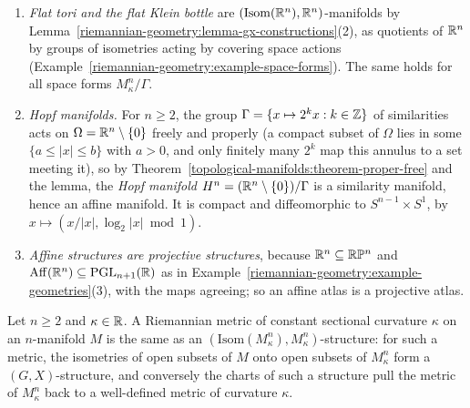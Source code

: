 \begin{example}\label{riemannian-geometry:example-gx-structures}
\begin{enumerate}
\item \emph{Flat tori and the flat Klein bottle} are $(\mathrm{Isom}(\mathbb{R}^n), \mathbb{R}^n)$-manifolds by Lemma~\ref{riemannian-geometry:lemma-gx-constructions}(2), as quotients of $\mathbb{R}^n$ by groups of isometries acting by covering space actions
(Example~\ref{riemannian-geometry:example-space-forms}). The same holds for all space forms $M^n_\kappa/\Gamma$.
\item \emph{Hopf manifolds.} For $n \geq 2$, the group $\Gamma = \{x \mapsto 2^kx : k \in \mathbb{Z}\}$ of similarities acts on $\Omega = \mathbb{R}^n \setminus \{0\}$ freely and properly (a compact subset of $\Omega$ lies in some
$\{a \leq |x| \leq b\}$ with $a > 0$, and only finitely many $2^k$ map this annulus to a set meeting it), so by Theorem~\ref{topological-manifolds:theorem-proper-free} and the lemma, the \emph{Hopf manifold}
$H^n = (\mathbb{R}^n \setminus \{0\})/\Gamma$ is a similarity manifold, hence an affine manifold. It is compact and diffeomorphic to $S^{n-1} \times S^1$, by $x \mapsto (x/|x|, \log_2|x| \bmod 1)$.
\item \emph{Affine structures are projective structures}, because $\mathbb{R}^n \subseteq \mathbb{R}\mathbb{P}^n$ and $\mathrm{Aff}(\mathbb{R}^n) \subseteq \mathrm{PGL}_{n+1}(\mathbb{R})$ as in Example~\ref{riemannian-geometry:example-geometries}(3), with
the maps agreeing; so an affine atlas is a projective atlas.
\end{enumerate}
\end{example}

\begin{proposition}\label{riemannian-geometry:proposition-constant-curvature-gx}
Let $n \geq 2$ and $\kappa \in \mathbb{R}$. A Riemannian metric of constant sectional curvature $\kappa$ on an $n$-manifold $M$ is the same as an $(\mathrm{Isom}(M^n_\kappa), M^n_\kappa)$-structure: for such a metric, the
isometries of open subsets of $M$ onto open subsets of $M^n_\kappa$ form a $(G, X)$-structure, and conversely the charts of such a structure pull the metric of $M^n_\kappa$ back to a well-defined metric of curvature $\kappa$.
\end{proposition}

